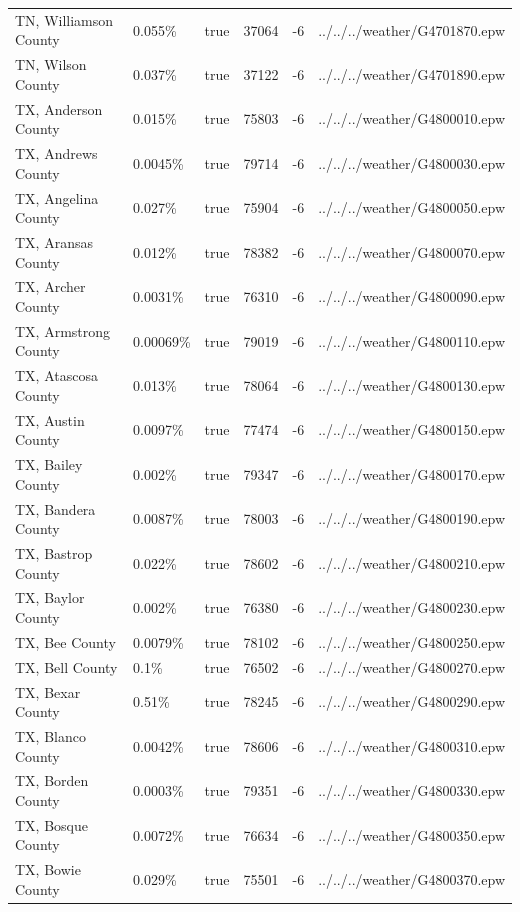 \begin{longtable}[]{@{}llllll@{}}
TN, Williamson County & 0.055\% & true & 37064 & -6 &
../../../weather/G4701870.epw \\
TN, Wilson County & 0.037\% & true & 37122 & -6 &
../../../weather/G4701890.epw \\
TX, Anderson County & 0.015\% & true & 75803 & -6 &
../../../weather/G4800010.epw \\
TX, Andrews County & 0.0045\% & true & 79714 & -6 &
../../../weather/G4800030.epw \\
TX, Angelina County & 0.027\% & true & 75904 & -6 &
../../../weather/G4800050.epw \\
TX, Aransas County & 0.012\% & true & 78382 & -6 &
../../../weather/G4800070.epw \\
TX, Archer County & 0.0031\% & true & 76310 & -6 &
../../../weather/G4800090.epw \\
TX, Armstrong County & 0.00069\% & true & 79019 & -6 &
../../../weather/G4800110.epw \\
TX, Atascosa County & 0.013\% & true & 78064 & -6 &
../../../weather/G4800130.epw \\
TX, Austin County & 0.0097\% & true & 77474 & -6 &
../../../weather/G4800150.epw \\
TX, Bailey County & 0.002\% & true & 79347 & -6 &
../../../weather/G4800170.epw \\
TX, Bandera County & 0.0087\% & true & 78003 & -6 &
../../../weather/G4800190.epw \\
TX, Bastrop County & 0.022\% & true & 78602 & -6 &
../../../weather/G4800210.epw \\
TX, Baylor County & 0.002\% & true & 76380 & -6 &
../../../weather/G4800230.epw \\
TX, Bee County & 0.0079\% & true & 78102 & -6 &
../../../weather/G4800250.epw \\
TX, Bell County & 0.1\% & true & 76502 & -6 &
../../../weather/G4800270.epw \\
TX, Bexar County & 0.51\% & true & 78245 & -6 &
../../../weather/G4800290.epw \\
TX, Blanco County & 0.0042\% & true & 78606 & -6 &
../../../weather/G4800310.epw \\
TX, Borden County & 0.0003\% & true & 79351 & -6 &
../../../weather/G4800330.epw \\
TX, Bosque County & 0.0072\% & true & 76634 & -6 &
../../../weather/G4800350.epw \\
TX, Bowie County & 0.029\% & true & 75501 & -6 &
../../../weather/G4800370.epw \\

\end{longtable}
